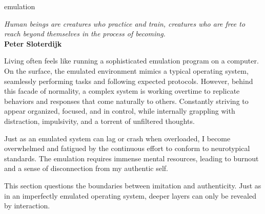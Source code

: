 



\begin{center}
\vspace*{\fill}
\Huge emulation

\vspace{2cm}

\begin{flushright}
\large
\textit{ Human beings are creatures who practice and train, creatures who are free to reach beyond themselves in the process of becoming.}\\
\textbf{ Peter Sloterdijk } 
\citep{sloterdijk2014}
\end{flushright}

\vspace*{\fill}
\end{center}

\normalsize

Living often feels like running a sophisticated emulation program on a computer. On the surface, the emulated environment mimics a typical operating system, seamlessly performing tasks and following expected protocols. However, behind this facade of normality, a complex system is working overtime to replicate behaviors and responses that come naturally to others. Constantly striving to appear organized, focused, and in control, while internally grappling with distraction, impulsivity, and a torrent of unfiltered thoughts.

Just as an emulated system can lag or crash when overloaded, I become overwhelmed and fatigued by the continuous effort to conform to neurotypical standards. The emulation requires immense mental resources, leading to burnout and a sense of disconnection from my authentic self.

This section questions the boundaries between imitation and authenticity. Just as in an imperfectly emulated operating system, deeper layers can only be revealed by interaction.

